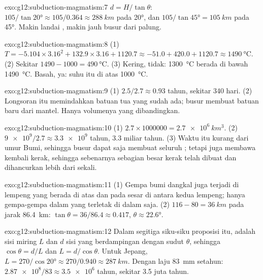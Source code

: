 \begin{solution}{exo:g12:subduction-magmatism:7}
$d = H/\tan\theta$: $105/\tan\ang{20} \approx 105/0.364 \approx
\qty{288}{km}$ pada \ang{20}, dan $105/\tan\ang{45} = \qty{105}{km}$ pada
\ang{45}. Makin landai , makin jauh busur dari palung.
\end{solution}

\begin{solution}{exo:g12:subduction-magmatism:8}
(1) $T = -5.104 \times 3.16^2 + 132.9 \times 3.16 + 1120.7 \approx -51.0 +
420.0 + 1120.7 \approx \qty{1490}{\celsius}$. (2) Sekitar $1490 - 1000 =
\qty{490}{\celsius}$. (3) Kering, tidak: \qty{1300}{\celsius} berada di bawah
\qty{1490}{\celsius}. Basah, ya: suhu itu di atas \qty{1000}{\celsius}.
\end{solution}

\begin{solution}{exo:g12:subduction-magmatism:9}
(1) $2.5/2.7 \approx 0.93$ tahun, sekitar 340 hari. (2) Longsoran itu
memindahkan batuan tua yang sudah ada; busur membuat batuan baru dari mantel.
Hanya volumenya yang dibandingkan.
\end{solution}

\begin{solution}{exo:g12:subduction-magmatism:10}
(1) $2.7 \times \num{1000000} = \qty{2.7e6}{km^3}$. (2) $\num{9e9}/2.7
\approx \num{3.3e9}$ tahun, 3.3 miliar tahun. (3) Waktu itu kurang dari umur
Bumi, sehingga busur dapat saja membuat seluruh ; tetapi 
juga membawa kembali kerak, sehingga sebenarnya sebagian besar kerak telah
dibuat dan dihancurkan lebih dari sekali.
\end{solution}

\begin{solution}{exo:g12:subduction-magmatism:11}
(1) Gempa bumi dangkal juga terjadi di lempeng yang berada di atas dan pada
sesar di antara kedua lempeng; hanya gempa-gempa dalam yang terletak di dalam
 saja.
(2) $116 - 80 = \qty{36}{km}$ pada jarak \qty{86.4}{km}: $\tan\theta = 36/86.4
\approx 0.417$, $\theta \approx \ang{22.6}$.
\end{solution}

\begin{solution}{exo:g12:subduction-magmatism:12}
Dalam segitiga siku-siku proposisi itu,  adalah sisi miring $L$ dan
$d$ sisi yang berdampingan dengan sudut $\theta$, sehingga $\cos\theta = d/L$ dan $L =
d/\cos\theta$. Untuk Jepang, $L = 270/\cos\ang{20} \approx 270/0.940 \approx
\qty{287}{km}$. Dengan laju \qty{83}{mm} setahun: $\num{2.87e8}/83 \approx \num{3.5e6}$
tahun, sekitar 3.5 juta tahun.
\end{solution}

